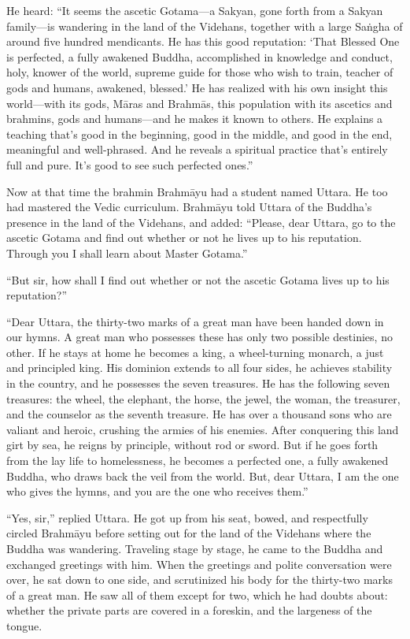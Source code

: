 \documentclass[12pt,openany]{book}%
\begin{document}
He heard: “It seems the ascetic Gotama—a Sakyan, gone forth from a Sakyan family—is wandering in the land of the Videhans, together with a large \textsanskrit{Saṅgha} of around five hundred mendicants. He has this good reputation: ‘That Blessed One is perfected, a fully awakened Buddha, accomplished in knowledge and conduct, holy, knower of the world, supreme guide for those who wish to train, teacher of gods and humans, awakened, blessed.’ He has realized with his own insight this world—with its gods, \textsanskrit{Māras} and \textsanskrit{Brahmās}, this population with its ascetics and brahmins, gods and humans—and he makes it known to others. He explains a teaching that’s good in the beginning, good in the middle, and good in the end, meaningful and well-phrased. And he reveals a spiritual practice that’s entirely full and pure. It’s good to see such perfected ones.” 

Now at that time the brahmin \textsanskrit{Brahmāyu} had a student named Uttara. He too had mastered the Vedic curriculum. \textsanskrit{Brahmāyu} told Uttara of the Buddha’s presence in the land of the Videhans, and added: “Please, dear Uttara, go to the ascetic Gotama and find out whether or not he lives up to his reputation. Through you I shall learn about Master Gotama.” 

“But sir, how shall I find out whether or not the ascetic Gotama lives up to his reputation?” 

“Dear Uttara, the thirty-two marks of a great man have been handed down in our hymns. A great man who possesses these has only two possible destinies, no other. If he stays at home he becomes a king, a wheel-turning monarch, a just and principled king. His dominion extends to all four sides, he achieves stability in the country, and he possesses the seven treasures. He has the following seven treasures: the wheel, the elephant, the horse, the jewel, the woman, the treasurer, and the counselor as the seventh treasure. He has over a thousand sons who are valiant and heroic, crushing the armies of his enemies. After conquering this land girt by sea, he reigns by principle, without rod or sword. But if he goes forth from the lay life to homelessness, he becomes a perfected one, a fully awakened Buddha, who draws back the veil from the world. But, dear Uttara, I am the one who gives the hymns, and you are the one who receives them.” 

“Yes, sir,” replied Uttara. He got up from his seat, bowed, and respectfully circled \textsanskrit{Brahmāyu} before setting out for the land of the Videhans where the Buddha was wandering. Traveling stage by stage, he came to the Buddha and exchanged greetings with him. When the greetings and polite conversation were over, he sat down to one side, and scrutinized his body for the thirty-two marks of a great man. He saw all of them except for two, which he had doubts about: whether the private parts are covered in a foreskin, and the largeness of the tongue. 
\end{document}
